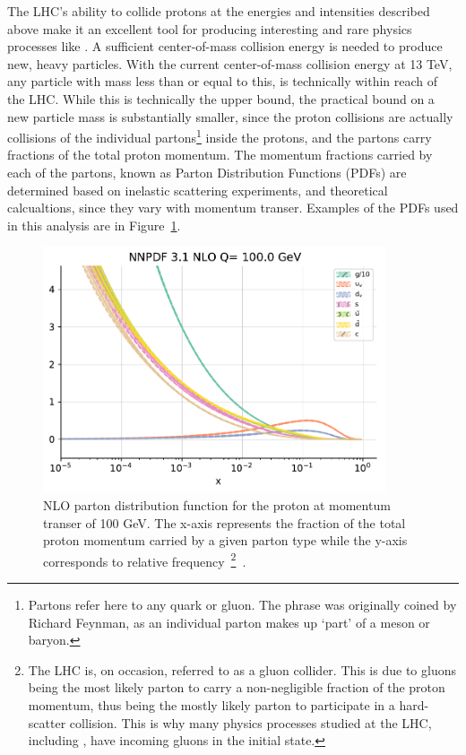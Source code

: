 The LHC's ability to collide protons at the energies and intensities described above make it an excellent tool for producing interesting
and rare physics processes like \tth.
A sufficient center-of-mass collision energy is needed to produce new, heavy particles.
With the current center-of-mass collision energy at 13 TeV, any particle with mass less than or equal to this, is 
technically within reach of the LHC. While this is technically the upper bound, the practical bound on a new particle mass is substantially smaller,
since the proton collisions are actually collisions of the individual partons\footnote{Partons refer here to any quark or gluon. The phrase was originally
coined by Richard Feynman, as an individual parton makes up `part' of a meson or baryon.} inside the protons, and the partons carry fractions of the total proton momentum. 
The momentum fractions carried by each of the partons, known as Parton Distribution Functions (PDFs) are determined based on inelastic scattering experiments, and theoretical calcualtions, since they
vary with momentum transer. Examples of the PDFs used in this analysis are in Figure~\ref{fig:nnpdf}. 

\begin{figure}[hbtp]
 \begin{center}
   \includegraphics[width=0.9\textwidth]{ch3_figs/nnpdf3p1_nlo_q100.pdf}
   \caption[NLO parton distribution function for the proton at Q = 100 GeV]{NLO parton distribution function for the proton at momentum transer of 100 GeV.
     The x-axis represents the fraction of the total proton momentum carried by a given parton type while the y-axis corresponds to relative
     frequency~\footnote{The LHC is, on occasion, referred to as a gluon collider. This is due to gluons being the most likely parton to carry a non-negligible fraction of the proton momentum, thus
       being the mostly likely parton to participate in a hard-scatter collision. This is why many physics processes studied at the LHC, including \tth, have incoming gluons in the initial state.}~\cite{nnpdf3}.}
   \label{fig:nnpdf}
 \end{center}
\end{figure}



